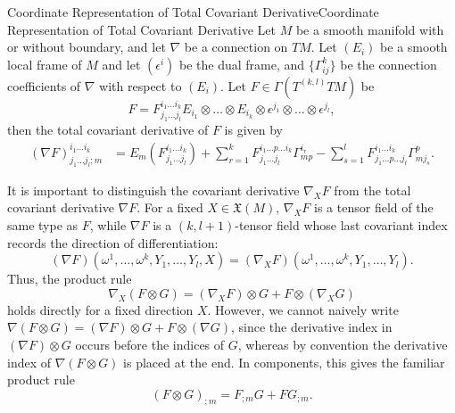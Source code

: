 \documentclass[../main.tex]{subfiles}
\begin{document}
\begin{proposition}{Coordinate Representation of Total Covariant Derivative}{Coordinate Representation of Total Covariant Derivative}
	Let $M$ be a smooth manifold with or without boundary, and let $\nabla$ be a connection on $TM$. Let $(E_i)$ be a smooth local frame of $M$ and let $(\epsilon^i)$ be the dual frame, and $\{\Gamma_{ij}^k\}$ be the connection coefficients of $\nabla$ with respect to $(E_i)$. Let $F \in \Gamma(T^{(k, l)} TM)$ be
	\begin{equation}
		F = F_{j_1 \ldots j_l}^{i_1 \ldots i_k} E_{i_1} \otimes \ldots \otimes E_{i_k} \otimes \epsilon^{j_1} \otimes \ldots \otimes \epsilon^{j_l},
	\end{equation}
	then the total covariant derivative of $F$ is given by
	\begin{equation}
		\begin{aligned}
			(\nabla F)_{j_1 \ldots j_l ; m}^{i_1 \ldots i_k} & = E_m(F_{j_1 \ldots j_l}^{i_1 \ldots i_k}) + \sum_{r=1}^k F_{j_1 \ldots j_l}^{i_1 \ldots p \ldots i_k} \Gamma_{mp}^{i_r} - \sum_{s=1}^l F_{j_1 \ldots p \ldots j_l}^{i_1 \ldots i_k} \Gamma_{mj_s}^{p}.
		\end{aligned}
	\end{equation}
\end{proposition}

\begin{remark}
	It is important to distinguish the covariant derivative $\nabla_X F$ from the total covariant derivative $\nabla F$. For a fixed $X \in \mathfrak{X}(M)$, $\nabla_X F$ is a tensor field of the same type as $F$, while $\nabla F$ is a $(k,l+1)$-tensor field whose last covariant index records the direction of differentiation:
	\begin{equation*}
		(\nabla F)(\omega^1,\ldots,\omega^k,Y_1,\ldots,Y_l,X) = (\nabla_X F)(\omega^1,\ldots,\omega^k,Y_1,\ldots,Y_l).
	\end{equation*}
	Thus, the product rule
	\begin{equation*}
		\nabla_X(F\otimes G) = (\nabla_X F)\otimes G + F\otimes(\nabla_X G)
	\end{equation*}
	holds directly for a fixed direction $X$. However, we cannot naively write $\nabla(F\otimes G) = (\nabla F)\otimes G + F\otimes(\nabla G)$, since the derivative index in $(\nabla F)\otimes G$ occurs before the indices of $G$, whereas by convention the derivative index of $\nabla(F\otimes G)$ is placed at the end. In components, this gives the familiar product rule
	\begin{equation*}
		(F\otimes G)_{;m} = F_{;m}G + FG_{;m}.
	\end{equation*}
\end{remark}
\end{document}
